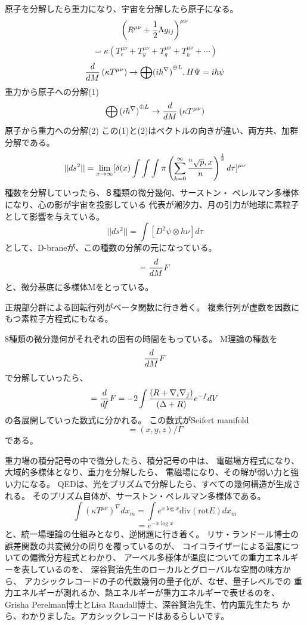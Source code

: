 \documentclass{jsarticle}
\begin{document}
     原子を分解したら重力になり、宇宙を分解したら原子になる。
     $$ \left(R^{\mu\nu} + {1 \over 2}\Lambda g_{ij}\right)^{\mu\nu} $$
     $$ = \kappa \left( T^{\mu\nu}_e + T^{\mu\nu}_y + T^{\mu\nu}_g +
     T^{\mu\nu}_h + \cdots \right) $$
     $$ {d \over dM}\left({\kappa T^{\mu\nu}} \right) \to {\bigoplus 
     ({i {\hbar^{{\nabla}}})}^{\oplus L}}, H \Psi = i \hbar \psi $$
     重力から原子への分解(1)
     $$ \bigoplus {({i \hbar^{\nabla})}^{\oplus L}} \to
          {d \over dM}\left(\kappa T^{\mu\nu} \right) $$ 
	  原子から重力への分解(2)
	  この(1)と(2)はベクトルの向きが違い、両方共、加群分解である。
    $$ ||ds^2|| = \lim_{x \to \infty} [\delta(x) 
    \int \int \int \pi \left( \sum_{k=0}^{\infty}
		{{}^n\sqrt{p},x \over n} \right)^{1 \over 2}d \tau]^{\mu\nu} $$
		種数を分解していったら、８種類の微分幾何、サーストン・
		ペレルマン多様体になり、心の影が宇宙を投影している
		代表が潮汐力、月の引力が地球に素粒子として影響を与えている。
    $$ ||ds^2|| = \int [D^2 \psi \otimes h \nu]d \tau $$
    として、D-braneが、この種数の分解の元になっている。
    $$ = {d \over d M}F $$
    と、微分基底に多様体Mをとっている。

    正規部分群による回転行列がベータ関数に行き着く。
    複素行列が虚数を因数にもつ素粒子方程式にもなる。

    8種類の微分幾何がそれぞれの固有の時間をもっている。
    M理論の種数を
    $$ {d \over d M}F $$
    で分解していったら、
    $$ = {d \over df}F = {{-2 \int {(R + \nabla_{i}\nabla_{j}) \over 
     {(\Delta + R)}}}}e^{-f}dV $$
     の各展開していった数式に分かれる。
     この数式がSeifert manifold 
     $$ = (x,y,z) / \Gamma $$
     である。

     重力場の積分記号の中で微分したら、積分記号の中は、
     電磁場方程式になり、大域的多様体となり、重力を分解したら、
     電磁場になり、その解が弱い力と強い力になる。
     QEDは、光をプリズムで分解したら、すべての幾何構造が生成される。
     そのプリズム自体が、サーストン・ペレルマン多様体である。
     $$ \int \left({\kappa T^{\mu\nu}}\right)^{\nabla}dx_m
     = \int e^{x \log x}\mathrm{div}(\mathrm{rot} E)dx_m $$
     $$ = e^{- x \log x} $$
     と、統一場理論の仕組みとなり、逆問題に行き着く。
     リサ・ランドール博士の誤差関数の共変微分の周りを覆っているのが、
     コイコライザーによる温度についての偏微分方程式とわかり、
     アーベル多様体が温度についての重力エネルギーを表しているのを、
     深谷賢治先生のローカルとグローバルな空間の味方から、
     アカシックレコードの子の代数幾何の量子化が、なぜ、量子レベルでの
     重力エネルギーが測れるか、熱エネルギーが重力エネルギーで表せるのを、
     Grisha Perelman博士とLisa Randall博士、深谷賢治先生、竹内薫先生たち
     から、わかりました。アカシックレコードはあるらしいです。
\end{document}
